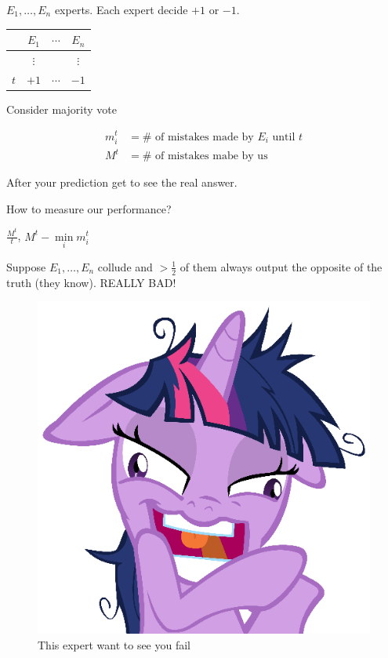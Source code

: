  
$E_1, \ldots, E_n$ experts. Each expert decide $+1$ or $-1$.
    
\begin{tabular}{c|c|c|c}
    &$E_1$ & $\cdots$ & $E_n$\\
    \hline
    &$\vdots$&&$\vdots$\\
    \hline
    $t$ & $+1$ & $\cdots$ & $-1$
\end{tabular}

Consider majority vote

\[
    \begin{aligned}
        m_i^t &= \# \text{ of mistakes made by }E_i\text{ until }t\\
        M^t &= \#\text{ of mistakes mabe by us}
    \end{aligned}
\]

After your prediction get to see the real answer.

How to measure our performance?

$\frac{M^t}{t}$, $\boxed{M^t- \min\limits_i m_i^t}$

Suppose $E_1, \ldots, E_n$ collude and $> \frac{1}{2}$ of them always output the opposite of the truth (they know). REALLY BAD!

\begin{figure}[!ht]
    \centering
    \includegraphics[scale=0.5]{figures/twilight_is_crazy_by_ajdispirito-d52zjfp}
    \caption{This expert want to see you fail}
\end{figure}

